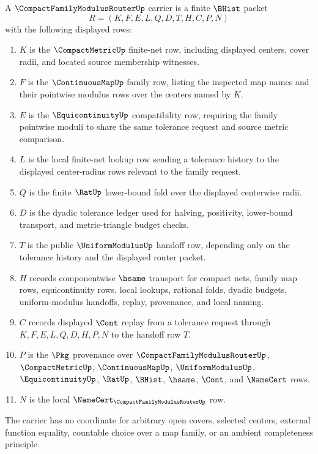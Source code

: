 \begin{definition}
\label{def:compact-family-modulus-router-carrier}
A $\CompactFamilyModulusRouterUp$ carrier is a finite $\BHist$ packet
$$
R=(K,F,E,L,Q,D,T,H,C,P,N)
$$
with the following displayed rows:
\begin{enumerate}
\item $K$ is the $\CompactMetricUp$ finite-net row, including displayed centers, cover radii, and located source membership witnesses.
\item $F$ is the $\ContinuousMapUp$ family row, listing the inspected map names and their pointwise modulus rows over the centers named by $K$.
\item $E$ is the $\EquicontinuityUp$ compatibility row, requiring the family pointwise moduli to share the same tolerance request and source metric comparison.
\item $L$ is the local finite-net lookup row sending a tolerance history to the displayed center-radius rows relevant to the family request.
\item $Q$ is the finite $\RatUp$ lower-bound fold over the displayed centerwise radii.
\item $D$ is the dyadic tolerance ledger used for halving, positivity, lower-bound transport, and metric-triangle budget checks.
\item $T$ is the public $\UniformModulusUp$ handoff row, depending only on the tolerance history and the displayed router packet.
\item $H$ records componentwise $\hsame$ transport for compact nets, family map rows, equicontinuity rows, local lookups, rational folds, dyadic budgets, uniform-modulus handoffs, replay, provenance, and local naming.
\item $C$ records displayed $\Cont$ replay from a tolerance request through $K,F,E,L,Q,D,H,P,N$ to the handoff row $T$.
\item $P$ is the $\Pkg$ provenance over $\CompactFamilyModulusRouterUp$, $\CompactMetricUp$, $\ContinuousMapUp$, $\UniformModulusUp$, $\EquicontinuityUp$, $\RatUp$, $\BHist$, $\hsame$, $\Cont$, and $\NameCert$ rows.
\item $N$ is the local $\NameCert_{\CompactFamilyModulusRouterUp}$ row.
\end{enumerate}
The carrier has no coordinate for arbitrary open covers, selected centers, external function equality, countable choice over a map family, or an ambient completeness principle.
\end{definition}

